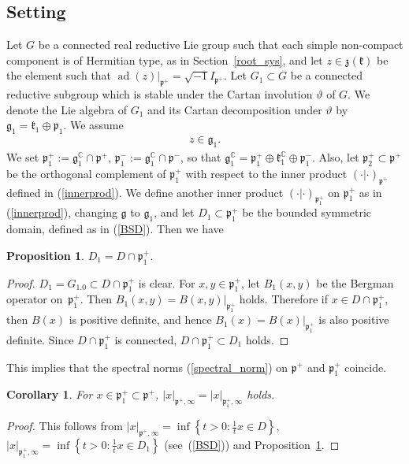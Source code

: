 \documentclass[11pt]{article}
\numberwithin{equation}{section}
\newtheorem{Corollary}[Theorem]{Corollary}
\newtheorem{Proposition}[Theorem]{Proposition}
{ \theoremstyle{definition}
\newtheorem{Definition}[Theorem]{Definition}
\newtheorem{Note}[Theorem]{Note}
\newtheorem{Example}[Theorem]{Example}
\newtheorem{Remark}[Theorem]{Remark} }
\newcommand{\BC}{\mathbb{C}}
\newcommand{\fg}{\mathfrak{g}}
\newcommand{\fk}{\mathfrak{k}}
\newcommand{\fp}{\mathfrak{p}}
\newcommand{\fz}{\mathfrak{z}}
\begin{document}
\subsection{Setting}
Let $G$ be a connected real reductive Lie group such that each simple non-compact component is of Hermitian type, as in Section~\ref{root_sys},
and let $z\in\fz(\fk)$ be the element such that $\operatorname{ad}(z)|_{\fp^+}=\sqrt{-1}I_{\fp^+}$.
Let $G_1\subset G$ be a connected reductive subgroup which is stable under the Cartan involution $\vartheta$ of $G$.
We denote the Lie algebra of $G_1$ and its Cartan decomposition under $\vartheta$ by $\fg_1=\fk_1\oplus \fp_1$. We assume
\begin{gather}\label{assumption}
z\in \fg_1.
\end{gather}
We set $\fp_1^+:=\fg_1^\BC\cap \fp^+$, $\fp_1^-:=\fg_1^\BC\cap \fp^-$, so that
$\fg_1^\BC=\fp^+_1\oplus \fk^\BC_1\oplus \fp^-_1$.
Also, let $\fp_2^+\subset\fp^+$ be the orthogonal complement of $\fp^+_1$ with respect to the inner product $(\cdot|\cdot)_{\fp^+}$
defined in (\ref{innerprod}).
We define another inner product $(\cdot|\cdot)_{\fp^+_1}$ on $\fp^+_1$ as in (\ref{innerprod}), changing $\fg$ to $\fg_1$,
and let $D_1\subset\fp^+_1$ be the bounded symmetric domain, defined as in (\ref{BSD}). Then we have
\begin{Proposition}\label{BSD_intersection}
$D_1=D\cap \fp^+_1$.
\end{Proposition}
\begin{proof}$D_1=G_1.0\subset D\cap\fp^+_1$ is clear. For $x,y\in \fp^+_1$, let $B_1(x,y)$ be the Bergman operator on~$\fp^+_1$.
Then $B_1(x,y)=B(x,y)|_{\fp^+_1}$ holds. Therefore if $x\in D\cap \fp^+_1$, then $B(x)$ is positive definite,
and hence $B_1(x)=B(x)|_{\fp^+_1}$ is also positive definite. Since $D\cap \fp^+_1$ is connected, $D\cap\fp^+_1\subset D_1$ holds.
\end{proof}

This implies that the spectral norms (\ref{spectral_norm}) on $\fp^+$ and $\fp^+_1$ coincide.
\begin{Corollary}
For $x\in\fp^+_1\subset\fp^+$, $|x|_{\fp^+,\infty}=|x|_{\fp^+_1,\infty}$ holds.
\end{Corollary}
\begin{proof}This follows from $|x|_{\fp^+,\infty}=\inf\left\{t>0\colon \frac{1}{t}x\in D\right\}$,
$|x|_{\fp^+_1,\infty}=\inf\left\{t>0\colon \frac{1}{t}x\in D_1\right\}$ \linebreak (see~(\ref{BSD})) and Proposition~\ref{BSD_intersection}.
\end{proof}
\end{document}
